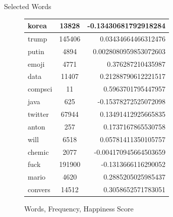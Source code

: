 \documentclass[final]{beamer}
\newlength{\onecolwid}
\begin{document}
\begin{frame}[t]
\begin{columns}[t]
\begin{column}{\onecolwid}
\begin{block}{Selected Words}
\begin{figure}[h]
\begin{center}
{\begin{tabular}{ | l | c | r |}
korea & 13828 & -0.13430681792918284 \\ \hline
trump & 145406 & 0.03434664466312476 \\ \hline
putin & 4894 & 0.0028080959853072603 \\ \hline
emoji & 4771 & 0.376287210435987 \\ \hline
data & 11407 & 0.21288790612221517 \\ \hline
compsci & 11 & 0.5963701795447957 \\ \hline
java & 625 & -0.15378272525072098 \\ \hline
twitter & 67944 & 0.13491412925665835 \\ \hline
anton & 257 & 0.1737167865530758 \\ \hline
will & 6518 & 0.05781411350105757 \\ \hline
chemic & 2077 & -0.004170945664503659 \\ \hline
fuck & 191900 & -0.1313666116290052 \\ \hline
mario & 4620 & 0.2885205025985437 \\ \hline
convers & 14512 & 0.3058652571783051 \\

    \hline
    
  \end{tabular}}
  \caption{Words, Frequency, Happiness Score}
\end{center}

\end{figure}
\begin{figure}[h]
\begin{center}
\end{center}
\end{figure}
\end{block}
\end{column}
\end{columns}
\end{frame}
\end{document}
